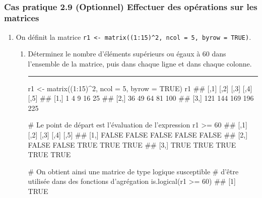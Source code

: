 \documentclass[12pt,twosided, notitlepage]{book}
\newenvironment{Shaded}{}{}
\newcommand{\KeywordTok}[1]{\textcolor[rgb]{0.00,0.00,1.00}{{#1}}}
\newcommand{\DataTypeTok}[1]{{#1}}
\newcommand{\DecValTok}[1]{{#1}}
\newcommand{\StringTok}[1]{\textcolor[rgb]{0.00,0.50,0.50}{{#1}}}
\newcommand{\CommentTok}[1]{\textcolor[rgb]{0.00,0.50,0.00}{{#1}}}
\newcommand{\OtherTok}[1]{\textcolor[rgb]{1.00,0.25,0.00}{{#1}}}
\newcommand{\NormalTok}[1]{{#1}}
\newif \ifsol
\renewenvironment{Shaded}{\begin{snugshade}}{\end{snugshade}}
\begin{document}
~

\subsubsection{\texorpdfstring{\textbf{Cas pratique 2.9} (Optionnel)
Effectuer des opérations sur les
matrices}{Cas pratique 2.9 (Optionnel) Effectuer des opérations sur les matrices}}\label{cas-pratique-2.9-optionnel-effectuer-des-operations-sur-les-matrices}


\begin{enumerate}
\def\labelenumi{\alph{enumi}.}
\item
  On définit la matrice
  \texttt{r1\ \textless{}-\ matrix((1:15)\^{}2,\ ncol\ =\ 5,\ byrow\ =\ TRUE)}.

  \begin{enumerate}
  \def\labelenumii{\roman{enumii}.}
  \item
    Déterminez le nombre d'éléments supérieurs ou égaux à 60 dans
    l'ensemble de la matrice, puis dans chaque ligne et dans chaque
    colonne.

    \ifsol 

    \begin{center} \rule{0.5\linewidth}{\linethickness}\end{center}

\begin{Shaded}
\begin{Highlighting}[]
\NormalTok{r1 <-}\StringTok{ }\KeywordTok{matrix}\NormalTok{((}\DecValTok{1}\NormalTok{:}\DecValTok{15}\NormalTok{)^}\DecValTok{2}\NormalTok{, }\DataTypeTok{ncol =} \DecValTok{5}\NormalTok{, }\DataTypeTok{byrow =} \OtherTok{TRUE}\NormalTok{)}
\NormalTok{r1}
  \NormalTok{##      [,1] [,2] [,3] [,4] [,5]}
  \NormalTok{## [1,]    1    4    9   16   25}
  \NormalTok{## [2,]   36   49   64   81  100}
  \NormalTok{## [3,]  121  144  169  196  225}

\CommentTok{# Le point de départ est l'évaluation de l'expression}
\NormalTok{r1 >=}\StringTok{ }\DecValTok{60}
  \NormalTok{##       [,1]  [,2]  [,3]  [,4]  [,5]}
  \NormalTok{## [1,] FALSE FALSE FALSE FALSE FALSE}
  \NormalTok{## [2,] FALSE FALSE  TRUE  TRUE  TRUE}
  \NormalTok{## [3,]  TRUE  TRUE  TRUE  TRUE  TRUE}

\CommentTok{# On obtient ainsi une matrice de type logique susceptible}
\CommentTok{# d'être utilisée dans des fonctions d'agrégation}
\KeywordTok{is.logical}\NormalTok{(r1 >=}\StringTok{ }\DecValTok{60}\NormalTok{)}
  \NormalTok{## [1] TRUE}


\end{Highlighting}
\end{Shaded}
\end{enumerate}
\end{enumerate}
\end{document}
